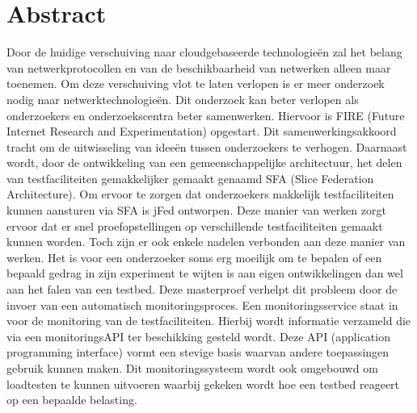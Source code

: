 \newpage
\chapter*{Abstract}
\npar
Door de huidige verschuiving naar cloudgebaseerde technologie\"en zal het belang 
van netwerkprotocollen en van de beschikbaarheid van netwerken alleen maar toenemen.
Om deze verschuiving vlot te laten verlopen is er meer onderzoek nodig naar netwerktechnologie\"en. Dit onderzoek kan beter verlopen als onderzoekers en onderzoekscentra beter samenwerken. Hiervoor is FIRE (Future Internet Research and Experimentation) opgestart. Dit samenwerkingsakkoord tracht om de uitwisseling van idee\"en tussen onderzoekers te verhogen.
\npar
Daarnaast wordt, door de ontwikkeling van een gemeenschappelijke architectuur,  het delen van testfaciliteiten gemakkelijker gemaakt genaamd SFA (Slice Federation Architecture). Om ervoor te zorgen dat onderzoekers makkelijk testfaciliteiten kunnen aansturen via SFA is jFed ontworpen. Deze manier van werken zorgt ervoor dat er snel proefopstellingen op verschillende testfaciliteiten gemaakt kunnen worden. Toch zijn er ook enkele nadelen verbonden aan deze manier van werken. Het is voor een onderzoeker soms erg moeilijk om te bepalen of een bepaald gedrag in zijn experiment te wijten is aan eigen ontwikkelingen dan wel aan het falen van een testbed.
\npar
Deze masterproef verhelpt dit probleem door de invoer van een automatisch monitoringsproces. Een monitoringsservice staat in voor de monitoring van de testfaciliteiten. Hierbij wordt informatie verzameld die via een monitoringsAPI ter beschikking gesteld wordt. Deze API (application programming interface) vormt een stevige basis waarvan andere toepassingen gebruik kunnen maken.
\npar
Dit monitoringssysteem wordt ook omgebouwd om loadtesten te kunnen uitvoeren waarbij gekeken wordt hoe een testbed reageert op een bepaalde belasting.